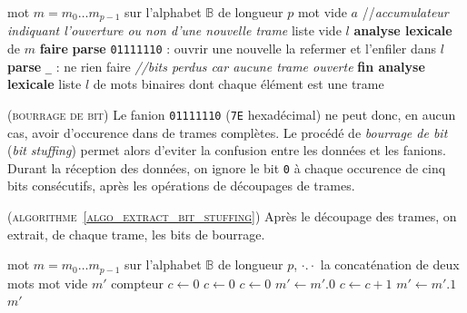 \documentclass[twocolumn,pre,floats,aps,amsmath,amssymb]{revtex4}
\newenvironment{implementation}[1][Impl\'ementation.]{\begin{trivlist}
\item[\hskip \labelsep {\bfseries #1}]}{\end{trivlist}}
\newenvironment{remark}[1][Remarque.]{\begin{trivlist}
\item[\hskip \labelsep {\bfseries #1}]}{\end{trivlist}}
\begin{document}
\begin{algorithm}[h]
\caption{D\'ecoupage de trames AX.25}
\label{algo_decoupage_trames_ax25}
\begin{algorithmic}[1]
  \REQUIRE mot $m = m_0 \dots m_{p  - 1}$ sur l'alphabet $\mathbb{B}$ de longueur $p$
  \STATE mot vide $a$ \hfill //\textit{accumulateur indiquant l'ouverture ou non d'une nouvelle trame}
  \STATE liste vide $l$
  \STATE \textbf{analyse lexicale} de $m$ \textbf{faire}
  \STATE \textbf{parse} \texttt{01111110} :
  \STATE ouvrir une nouvelle
  \ELSE
  \STATE la refermer et l'enfiler dans $l$
  \ENDIF
  \ENDIF
  \ENDIF
  \STATE \textbf{parse} \texttt{\_} :
  \ELSE
  \STATE ne rien faire \hfill \textit{//bits perdus car aucune trame ouverte}
  \ENDIF
  \STATE \textbf{fin analyse lexicale}
  \RETURN liste $l$ de mots binaires dont chaque \'el\'ement est une trame
\end{algorithmic}
\end{algorithm}

\begin{remark}
  \textsc{(bourrage de bit)}
  Le fanion \texttt{01111110} (\texttt{7E} hexad\'ecimal) ne peut donc, en aucun cas, avoir d'occurence dans de trames compl\`etes\cite{IITB}. Le proc\'ed\'e de \textit{bourrage de bit} (\textit{bit stuffing}) permet alors d'eviter la confusion entre les donn\'ees et les fanions. Durant la r\'eception des donn\'ees, on ignore le bit \texttt{0} \`a chaque occurence de cinq bits  cons\'ecutifs, apr\`es les op\'erations de d\'ecoupages de trames.
\end{remark}

\begin{implementation}
  (\textsc{algorithme~\ref{algo_extract_bit_stuffing}})
  { \color{rltred}{\Radioactivity} }
  Apr\`es le d\'ecoupage des trames, on extrait, de chaque trame, les bits de bourrage.
\end{implementation}

\begin{algorithm}[h]
\caption{Extraction du bit de bourrage}
\label{algo_extract_bit_stuffing}
\begin{algorithmic}[1]
  \REQUIRE mot $m = m_0 \dots m_{p  - 1}$ sur l'alphabet $\mathbb{B}$ de longueur $p$, $\cdot . \cdot$ la concat\'enation de deux mots
  \STATE mot vide $m'$
  \STATE compteur $c \leftarrow 0$
  \STATE $c \leftarrow 0$
  \ELSE
  \STATE $c \leftarrow 0$
  \STATE $m' \leftarrow m'.0$    
  \ENDIF
  \ELSE
  \STATE $c \leftarrow c + 1$
  \STATE $m' \leftarrow m' . 1$
  \ENDIF
  \ENDFOR
  \RETURN $m'$
\end{algorithmic}
\end{algorithm}
\end{document}
